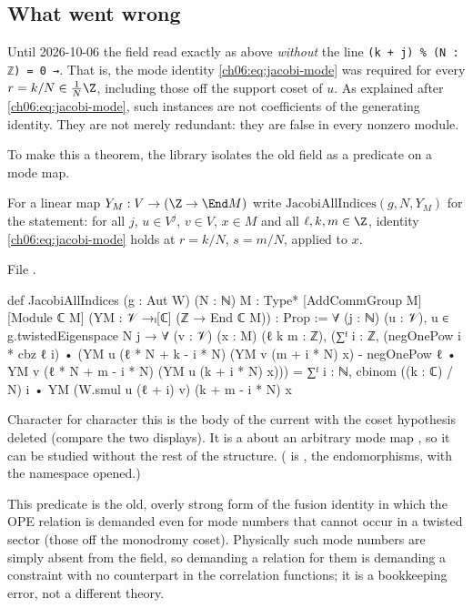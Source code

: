 \subsection{What went wrong}

Until 2026-10-06 the field  read exactly as above \emph{without} the line
\texttt{(k + j) \% (N : ℤ) = 0 →}.  That is, the mode identity \eqref{ch06:eq:jacobi-mode} was
required for every $r=k/N\in\frac1N\Z$, including those off the support coset of $u$.  As explained
after \eqref{ch06:eq:jacobi-mode}, such instances are not coefficients of the generating identity.
They are not merely redundant: they are false in every nonzero module.

To make this a theorem, the library isolates the old field as a predicate on a mode map.
\begin{definition}\label{ch06:def:allindices}
For a linear map $Y_M:V\to(\Z\to\End M)$ write $\mathrm{JacobiAllIndices}(g,N,Y_M)$ for the
statement: for all $j$, $u\in V^j$, $v\in V$, $x\in M$ and all $\ell,k,m\in\Z$, identity
\eqref{ch06:eq:jacobi-mode} holds at $r=k/N$, $s=m/N$, applied to $x$.
\end{definition}
\noindent File .
\begin{leancode}
def JacobiAllIndices (g : Aut W) (N : ℕ) {M : Type*} [AddCommGroup M] [Module ℂ M]
    (YM : 𝒱 →ₗ[ℂ] (ℤ → End ℂ M)) : Prop :=
  ∀ (j : ℕ) (u : 𝒱), u ∈ g.twistedEigenspace N j → ∀ (v : 𝒱) (x : M) (ℓ k m : ℤ),
    (∑ᶠ i : ℤ, (negOnePow i * cbz ℓ i) •
        (YM u (ℓ * N + k - i * N) (YM v (m + i * N) x)
          - negOnePow ℓ • YM v (ℓ * N + m - i * N) (YM u (k + i * N) x)))
      = ∑ᶠ i : ℕ, cbinom ((k : ℂ) / N) i • YM (W.smul u (ℓ + i) v) (k + m - i * N) x
\end{leancode}
\begin{dictionary}
Character for character this is the body of the current  with the
coset hypothesis deleted (compare the two displays).  It is a  about an arbitrary mode
map , so it can be studied without the rest of the structure.  ( is
, the endomorphisms, with the namespace opened.)
\end{dictionary}

\begin{physics}
This predicate is the old, overly strong form of the fusion identity in which the OPE relation is demanded even for mode numbers that cannot occur in a twisted sector (those off the monodromy coset). Physically such mode numbers are simply absent from the field, so demanding a relation for them is demanding a constraint with no counterpart in the correlation functions; it is a bookkeeping error, not a different theory.
\end{physics}

